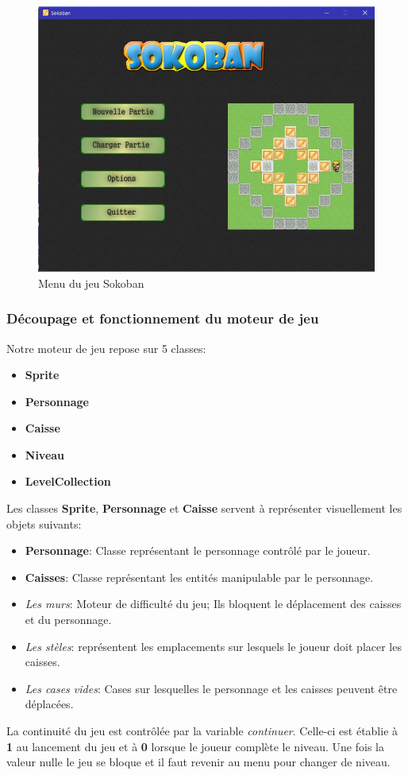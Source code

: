 \documentclass{article}
\begin{document}
\begin{figure}[!h]
\centering
\includegraphics[scale=0.5]{img/menu-interface.jpg}
\caption{Menu du jeu Sokoban}
\end{figure}
\newline
		\subsubsection{Découpage et fonctionnement du moteur de jeu}
Notre moteur de jeu repose sur 5 classes:
\begin{itemize}
\item \textbf{Sprite} 
\item \textbf{Personnage }
\item \textbf{Caisse}
\item \textbf{Niveau}
\item \textbf{LevelCollection}
\end{itemize}
Les classes \textbf{Sprite}, \textbf{Personnage} et \textbf{Caisse} servent à représenter visuellement les objets suivants:
\begin{itemize}
\item \textbf{Personnage}: Classe représentant le personnage contrôlé par le joueur.
\item \textbf{Caisses}: Classe représentant les entités manipulable par le personnage.
\item \textit{Les murs}: Moteur de difficulté du jeu; Ils bloquent le déplacement des caisses et du personnage.
\item \textit{Les stèles}: représentent les emplacements sur lesquels le joueur doit placer les caisses.
\item \textit{Les cases vides}: Cases sur lesquelles le personnage et les caisses peuvent être déplacées.
\end{itemize}
La continuité du jeu est contrôlée par la variable \textit{continuer}. Celle-ci est établie à \textbf{1} au lancement du jeu et à \textbf{0} lorsque le joueur complète le niveau. Une fois la valeur nulle le jeu se bloque et il faut revenir au menu pour changer de niveau. \newline
			
\end{document}

